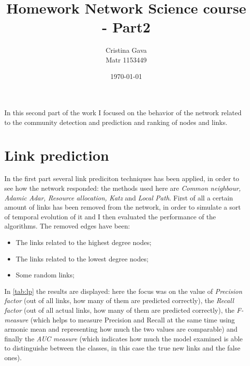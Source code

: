 \documentclass[12pt,a4paper]{article}
\title{\blue Homework Network Science course - Part2}
\author{Cristina Gava\\%
Matr 1153449}
\date{\today}
\begin{document}
\maketitle
In this second part of the work I focused on the behavior of the network related to the community detection and prediction and ranking of nodes and links.

\section*{Link prediction}
In the first part several link prediciton techniques has been applied, in order to see how the network responded: the methods used here are \textit{Common neighbour, Adamic Adar, Resource allocation, Katz} and \textit{Local Path}. First of all a certain amount of links has been removed from the network, in order to simulate a sort of temporal evolution of it and I then evaluated the performance of the algorithms. The removed edges have been:
\begin{itemize}
  \item The links related to the highest degree nodes;
  \item The links related to the lowest degree nodes;
  \item Some random links;
\end{itemize}
In \autoref{tab:lp} the results are displayed: here the focus was on the value of \textit{Precision factor} (out of all links, how many of them are predicted correctly), the \textit{Recall factor} (out of all actual links, how many of them are predicted correctly), the \textit{F-measure} (which helps to measure Precision and Recall at the same time using armonic mean and representing how much the two values are comparable) and finally the \textit{AUC measure} (which indicates how much the model examined is able to distinguishe between the classes, in this case the true new links and the false ones).
\end{document}
